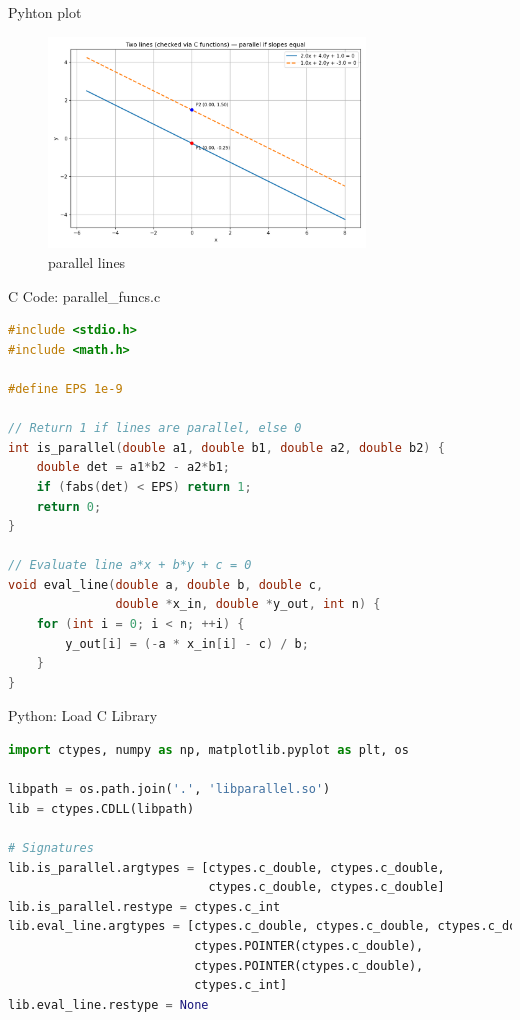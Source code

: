 \documentclass{beamer}
\begin{document}
\begin{frame}{Pyhton plot}
\begin{figure}[h!]
    \centering
    \includegraphics[width=0.75\textwidth]{figs/6.png}
    \caption{parallel lines}
    \label{fig:example_image}
    
\end{figure}
\end{frame}
\begin{frame}[fragile]{C Code: parallel\_funcs.c}
\begin{lstlisting}[language=C, basicstyle=\ttfamily\scriptsize, keywordstyle=\color{blue}]
#include <stdio.h>
#include <math.h>

#define EPS 1e-9

// Return 1 if lines are parallel, else 0
int is_parallel(double a1, double b1, double a2, double b2) {
    double det = a1*b2 - a2*b1;
    if (fabs(det) < EPS) return 1;
    return 0;
}

// Evaluate line a*x + b*y + c = 0
void eval_line(double a, double b, double c,
               double *x_in, double *y_out, int n) {
    for (int i = 0; i < n; ++i) {
        y_out[i] = (-a * x_in[i] - c) / b;
    }
}
\end{lstlisting}
\end{frame}

\begin{frame}[fragile]{Python: Load C Library}
\begin{lstlisting}[language=Python, basicstyle=\ttfamily\scriptsize, keywordstyle=\color{blue}]
import ctypes, numpy as np, matplotlib.pyplot as plt, os

libpath = os.path.join('.', 'libparallel.so')
lib = ctypes.CDLL(libpath)

# Signatures
lib.is_parallel.argtypes = [ctypes.c_double, ctypes.c_double,
                            ctypes.c_double, ctypes.c_double]
lib.is_parallel.restype = ctypes.c_int
lib.eval_line.argtypes = [ctypes.c_double, ctypes.c_double, ctypes.c_double,
                          ctypes.POINTER(ctypes.c_double),
                          ctypes.POINTER(ctypes.c_double),
                          ctypes.c_int]
lib.eval_line.restype = None
\end{lstlisting}
\end{frame}
\end{document}
